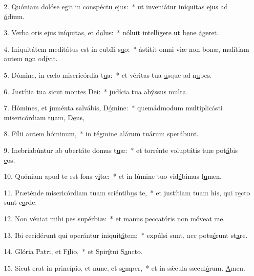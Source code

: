 2. Quóniam dolóse egit in conspéctu \uline{e}jus:~* ut inveniátur iníquitas \uline{e}jus ad \uline{ó}dium.\par 
3. Verba oris ejus iníquitas, et d\uline{o}lus:~* nóluit intellígere ut b\uline{e}ne \uline{á}geret.\par 
4. Iniquitátem meditátus est in cubíli s\uline{u}o:~* ástitit omni viæ non bonæ, malítiam autem n\uline{o}n od\uline{í}vit.\par 
5. Dómine, in cælo misericórdia t\uline{u}a:~* et véritas tua \uline{u}sque ad n\uline{u}bes.\par 
6. Justítia tua sicut montes D\uline{e}i:~* judícia tua ab\uline{ý}ssus m\uline{u}lta.\par 
7. Hómines, et juménta salvábis, D\uline{ó}mine:~* quemádmodum multiplicásti misericórdiam t\uline{u}am, D\uline{e}us,\par 
8. Fílii autem h\uline{ó}minum,~* in tégmine alárum tu\uline{á}rum sper\uline{á}bunt.\par 
9. Inebriabúntur ab ubertáte domus t\uline{u}æ:~* et torrénte voluptátis tuæ pot\uline{á}bis \uline{e}os.\par 
10. Quóniam apud te est fons v\uline{i}tæ:~* et in lúmine tuo vid\uline{é}bimus l\uline{u}men.\par 
11. Præténde misericórdiam tuam sciéntib\uline{u}s te,~* et justítiam tuam his, qui r\uline{e}cto sunt c\uline{o}rde.\par 
12. Non véniat mihi pes sup\uline{é}rbiæ:~* et manus peccatóris non m\uline{ó}ve\uline{a}t me.\par 
13. Ibi cecidérunt qui operántur iniquit\uline{á}tem:~* expúlsi sunt, nec potu\uline{é}runt st\uline{a}re.\par 
14. Glória Patri, et F\uline{í}lio,~* et Spir\uline{í}tui S\uline{a}ncto.\par 
15. Sicut erat in princípio, et nunc, et s\uline{e}mper,~* et in sǽcula sæcul\uline{ó}rum. \uline{A}men.\par 
